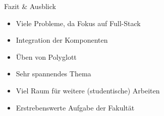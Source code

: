 \documentclass[compress]{beamer}
\begin{document}
\begin{frame}{Fazit \& Ausblick}
  \begin{itemize}
    \item Viele Probleme, da Fokus auf Full-Stack
    \item Integration der Komponenten
    \item Üben von Polyglott
  \end{itemize}
  \begin{itemize}
    \item Sehr spannendes Thema
    \item Viel Raum für weitere (studentische) Arbeiten
    \item Erstrebenswerte Aufgabe der Fakultät
  \end{itemize}
\end{frame}

\end{document}
